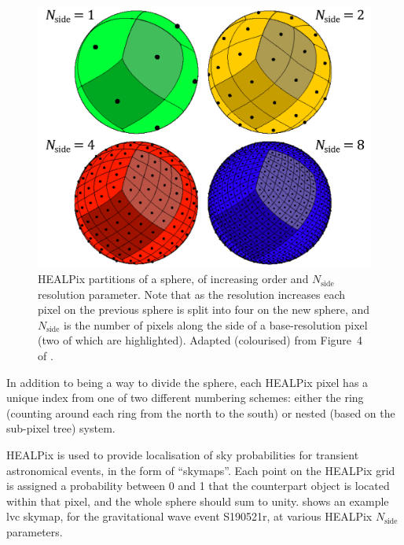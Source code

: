 \begin{colsection}
\begin{colsection}
\begin{figure}[t]
\begin{center}
\includegraphics[width=0.7\linewidth]{images/healpix.pdf}
\end{center}
\caption[HEALPix partitions of a sphere]{HEALPix partitions of a sphere, of increasing order and $N_\text{side}$ resolution parameter. Note that as the resolution increases each pixel on the previous sphere is split into four on the new sphere, and $N_\text{side}$ is the number of pixels along the side of a base-resolution pixel (two of which are highlighted). Adapted (colourised) from Figure~4 of \citet{HEALPix}.
}
\label{fig:healpix}
\end{figure}


In addition to being a way to divide the sphere, each HEALPix pixel has a unique index from one of two different numbering schemes: either the ring (counting around each ring from the north to the south) or nested (based on the sub-pixel tree) system.

HEALPix is used to provide localisation of sky probabilities for transient astronomical events, in the form of ``skymaps''. Each point on the HEALPix grid is assigned a probability between 0 and 1 that the counterpart object is located within that pixel, and the whole sphere should sum to unity.  shows an example \gls{lvc} skymap, for the gravitational wave event S190521r, at various HEALPix $N_\text{side}$ parameters.


\begin{figure}[p]
\begin{center}

\begin{tabular}{cc}


\end{tabular}
\end{center}
\end{figure}
\end{colsection}
\end{colsection}
